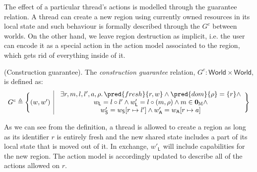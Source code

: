 The effect of a particular thread's actions is modelled through the guarantee relation. A thread can create a new region using currently owned resources in its local state and such behaviour is formally described through the $G^c$ between worlds. On the other hand, we leave region destruction as implicit, i.e. the user can encode it as a special action in the action model associated to the region, which gets rid of everything inside of it.
\begin{defn}
	(Construction guarantee).
	The \emph{construction guarantee} relation, $G^c : \mathsf{World} \times \mathsf{World}$, is defined as:
	\[
	\begin{array}{r | l}
		G^c \triangleq \Bigg\{ (w, w')
		&
		\begin{array}{c}
			\exists r, m, l, l', a, \rho \ldotp \pred{fresh}{r, w} \land \pred{dom}{\rho} = \{r\} \land
			\\
			w_\mathsf{L} = l \circ l' \land w'_\mathsf{L} = l \circ (m, \rho) \land m \in \mathbf{0}_\mathbb{M} \land
			\\
			w'_\mathsf{S} = w_\mathsf{S}[r \mapsto l'] \land w'_\mathsf{A} = w_\mathsf{A}[r \mapsto a]
		\end{array}
		\Bigg\}
	\end{array}
	\]
\end{defn}
As we can see from the definition, a thread is allowed to create a region as long as its identifier $r$ is entirely fresh and the new shared state includes a part of its local state that is moved out of it. In exchange, $w'_\mathsf{L}$ will include capabilities for the new region. The action model is accordingly updated to describe all of the actions allowed on $r$.


